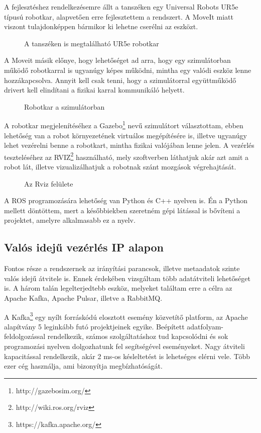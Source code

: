 \documentclass[11pt,a4paper,oneside]{article}
\newcommand{\insertfig}[4]{
	\vspace*{2mm}
	\begin{figure}[#4]
		\center
		\resizebox{#3}{!}{\texttt{[image: images/\#1]}}
		\parbox{0.8\textwidth}{\vspace*{4mm}\caption{{#2}}\small\label{fig:#1}}
	\end{figure}
	\vspace*{-2\parskip}
}
\begin{document}
A fejlesztéshez rendelkezésemre állt a tanszéken egy Universal Robots UR5e típusú robotkar, alapvetően erre fejlesztettem a rendszert. A MoveIt miatt viszont tulajdonképpen bármikor ki lehetne cserélni az eszközt.

\insertfig{ur5e}{A tanszéken is megtalálható UR5e robotkar}{6cm}{h!}

A Moveit másik előnye, hogy lehetőséget ad arra, hogy egy szimulátorban működő robotkarral is ugyanúgy képes működni, mintha egy valódi eszköz lenne hozzákapcsolva. Annyit kell csak tenni, hogy a szimulátorral együttműködő drivert kell elindítani a fizikai karral kommunikáló helyett.

\insertfig{ur5e_sim}{Robotkar a szimulátorban}{6cm}{h!}

A robotkar megjelenítéséhez a Gazebo\footnote{http://gazebosim.org/} nevű szimulátort választottam, ebben lehetőség van a robot környezetének virtuálos megépítésére is, illetve ugyanúgy lehet vezérelni benne a robotkart, mintha fizikai valójában lenne jelen. A vezérlés teszteléséhez az RVIZ\footnote{http://wiki.ros.org/rviz} használható, mely szoftverben láthatjuk akár azt amit a robot lát, illetve vizualizálhatjuk a robotnak szánt mozgások végrehajtását.

\insertfig{rviz}{Az Rviz felülete}{8cm}{h!}

A ROS programozására lehetőség van Python és C++ nyelven is. Én a Python mellett döntöttem, mert a későbbiekben szeretném gépi látással is bővíteni a projektet, amelyre alkalmasabb ez a nyelv.

\subsection{Valós idejű vezérlés IP alapon}

Fontos része a rendszernek az irányítási parancsok, illetve metaadatok szinte valós idejű átvitele is. Ennek érdekében vizsgáltam több adatátviteli lehetőséget is. A három talán legelterjedtebb eszköz, melyeket találtam erre a célra az Apache Kafka, Apache Pulsar, illetve a RabbitMQ.

A Kafka\footnote{https://kafka.apache.org/} egy nyílt forráskódú elosztott esemény közvetítő platform, az Apache alapítvány 5 leginkább futó projektjeinek egyike. Beépített adatfolyam-feldolgozással rendelkezik, számos szolgáltatáshoz tud kapcsolódni és sok programozási nyelven dolgozhatunk fel segítségével eseményeket. Nagy átviteli kapacitással rendelkezik, akár 2 ms-os késleltetést is lehetséges elérni vele. Több ezer cég használja, ami bizonyítja megbízhatóságát.
\end{document}
